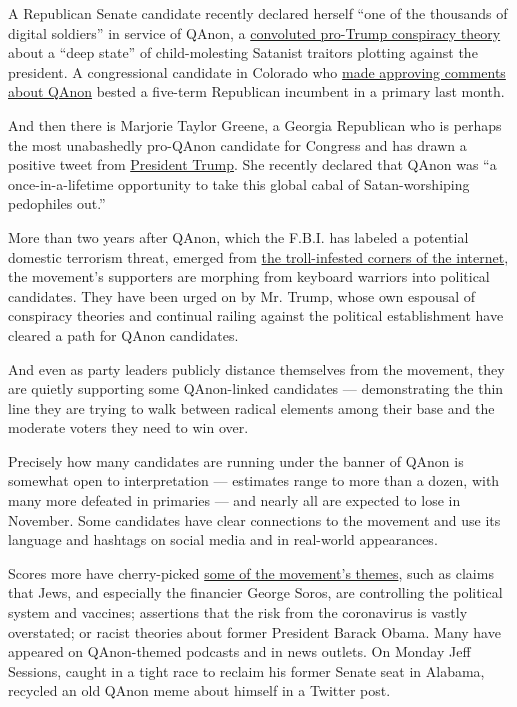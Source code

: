 A Republican Senate candidate recently declared herself ``one of the
thousands of digital soldiers'' in service of QAnon, a
\href{https://www.nytimes.com/2018/08/01/us/politics/what-is-qanon.html}{convoluted
pro-Trump conspiracy theory} about a ``deep state'' of child-molesting
Satanist traitors plotting against the president. A congressional
candidate in Colorado who
\href{https://www.nytimes.com/2020/06/30/us/lauren-boebert-colorado.html}{made
approving comments about QAnon} bested a five-term Republican incumbent
in a primary last month.

And then there is Marjorie Taylor Greene, a Georgia Republican who is
perhaps the most unabashedly pro-QAnon candidate for Congress and has
drawn a positive tweet from
\href{https://www.nytimes.com/interactive/2020/us/elections/donald-trump.html}{President
Trump}. She recently declared that QAnon was ``a once-in-a-lifetime
opportunity to take this global cabal of Satan-worshiping pedophiles
out.''

More than two years after QAnon, which the F.B.I. has labeled a
potential domestic terrorism threat, emerged from
\href{https://www.nytimes.com/2018/08/01/us/politics/what-is-qanon.html}{the
troll-infested corners of the internet}, the movement's supporters are
morphing from keyboard warriors into political candidates. They have
been urged on by Mr. Trump, whose own espousal of conspiracy theories
and continual railing against the political establishment have cleared a
path for QAnon candidates.

And even as party leaders publicly distance themselves from the
movement, they are quietly supporting some QAnon-linked candidates ---
demonstrating the thin line they are trying to walk between radical
elements among their base and the moderate voters they need to win over.

Precisely how many candidates are running under the banner of QAnon is
somewhat open to interpretation --- estimates range to more than a
dozen, with many more defeated in primaries --- and nearly all are
expected to lose in November. Some candidates have clear connections to
the movement and use its language and hashtags on social media and in
real-world appearances.

Scores more have cherry-picked
\href{https://www.nytimes.com/2020/02/09/us/politics/qanon-trump-conspiracy-theory.html}{some
of the movement's themes}, such as claims that Jews, and especially the
financier George Soros, are controlling the political system and
vaccines; assertions that the risk from the coronavirus is vastly
overstated; or racist theories about former President Barack Obama. Many
have appeared on QAnon-themed podcasts and in news outlets. On Monday
Jeff Sessions, caught in a tight race to reclaim his former Senate seat
in Alabama, recycled an old QAnon meme about himself in a Twitter post.

